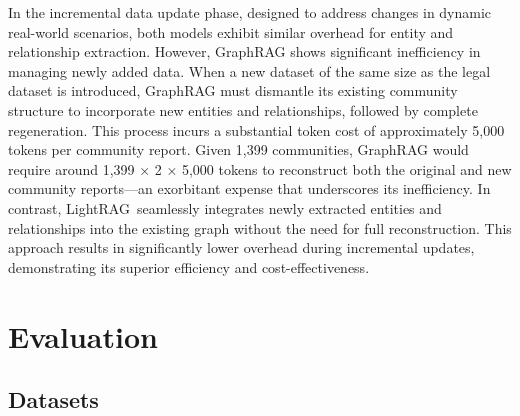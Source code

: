 \documentclass{article} %
\def\model{LightRAG}
\begin{document}
In the incremental data update phase, designed to address changes in dynamic real-world scenarios, both models exhibit similar overhead for entity and relationship extraction. However, GraphRAG shows significant inefficiency in managing newly added data. When a new dataset of the same size as the legal dataset is introduced, GraphRAG must dismantle its existing community structure to incorporate new entities and relationships, followed by complete regeneration. This process incurs a substantial token cost of approximately 5,000 tokens per community report. Given 1,399 communities, GraphRAG would require around 1,399 × 2 × 5,000 tokens to reconstruct both the original and new community reports—an exorbitant expense that underscores its inefficiency. In contrast, \model\ seamlessly integrates newly extracted entities and relationships into the existing graph without the need for full reconstruction. This approach results in significantly lower overhead during incremental updates, demonstrating its superior efficiency and cost-effectiveness.



% 
\section{Evaluation}
\label{sec:eval}

\subsection{Datasets}

\end{document}
